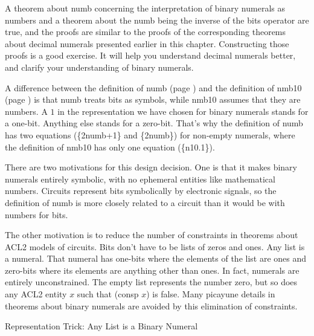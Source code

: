 A theorem about numb concerning the interpretation of
binary numerals as numbers and a theorem about the numb
being the inverse of the bits operator are true,
and the proofs are similar to the proofs of the corresponding
theorems about decimal numerals presented earlier in this chapter.
Constructing those proofs is a good exercise.
It will help you understand decimal numerals better,
and clarify your understanding of binary numerals.

\begin{aside}
A difference between the definition of numb (page \pageref{nmb-defun})
and the definition of nmb10 (page \pageref{nmb10-defun})
is that numb treats bits as symbols,
while nmb10 assumes that they are numbers.
A $1$ in the representation we have chosen for binary numerals
stands for a one-bit. Anything else stands for a zero-bit.
That's why the definition of numb has two equations (\{2numb+1\} and \{2numb\})
for non-empty numerals,
where the definition of nmb10 has only one equation (\{n10.1\}).

There are two motivations for this design decision.
One is that it makes binary numerals entirely symbolic,
with no ephemeral entities like mathematical numbers.
Circuits represent bits symbolically by electronic signals,
so the definition of numb is more closely
related to a circuit than it would be with numbers for bits.

The other motivation is to reduce the number of constraints
in theorems about ACL2 models of circuits.
Bits don't have to be lists of zeros and ones.
Any list is a numeral.
That numeral has one-bits where the elements of the list are ones
and zero-bits where its elements are anything other than ones.
In fact, numerals are entirely unconstrained.
The empty list represents the number zero,
but so does any ACL2 entity $x$ such that (consp $x$) is false.
Many picayune details in theorems about binary numerals
are avoided by this elimination of constraints.
\caption{Representation Trick: Any List is a Binary Numeral}
\label{aside:numeral-representation-trick}
\end{aside}


